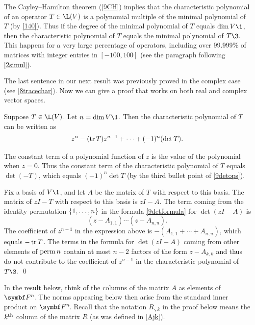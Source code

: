 
The Cayley--Hamilton theorem (\ref{9CH}) implies that the characteristic polynomial of an operator $T \in \L(V)$ is a polynomial multiple of the minimal polynomial of $T$ (by \ref{140}). Thus if the degree of the minimal polynomial of $T$ equals $\dim V\1$, then the characteristic polynomial of $T$ equals the minimal polynomial of $T\3$. This happens for a very large percentage of operators, including over 99.999\% of  matrices with integer entries in $[-100, 100]$ (see the paragraph following \ref{2simul}).

The last sentence in our next result was previously proved in the complex case (see \ref{8tracechar}). Now we can give a proof that works on both real and complex vector spaces.

{Suppose $T \in \L(V)$. Let $n = \dim V\1$. Then the characteristic polynomial of $T$ can be written as
\[
z^n - (\operatorname{tr} T) z^{n-1} + \dots + (-1)^n (\det T).
\]}

\proof
The constant term of a polynomial function of $z$ is the value of the polynomial when $z = 0$. Thus the constant term of the characteristic polynomial of $T$ equals $\det(-T)$, which equals $(-1)^n \det T$ (by the third bullet point of \ref{9detops}).

Fix a basis of $V\1$, and let $A$ be the matrix of $T$ with respect to this basis. The matrix of $zI - T$ with respect to this basis is $zI - A$. The term coming from the identity permutation $\{1, \ldots, n\}$ in the formula \ref{9detformula} for $\det(zI - A)$ is
\[
(z - A_{1,1}) \cdots (z - A_{n,n}).
\]
The coefficient of $z^{n-1}$ in the expression above is $-(A_{1,1} + \cdots + A_{n,n})$,
 which equals $-\operatorname{tr} T$. The terms in the formula for $\det(zI - A)$ coming from other elements of $\operatorname{perm} n$ contain at most $n-2$ factors of the form $z - A_{k,k}$ and thus do not contribute to the coefficient of $z^{n-1}$ in the characteristic polynomial of $T\3$.
\qed

\pagebreak[3]


In the result below, think of the columns of the  matrix $A$ as elements of $\FF{n}$. The norms appearing below then arise from the standard inner product on $\FF{n}$. Recall that the notation $R_{\cdot, k}$ in the proof below means the $k^{\text{{th}}}$ column of the matrix $R$ (as was defined in \ref{Ajk}).

